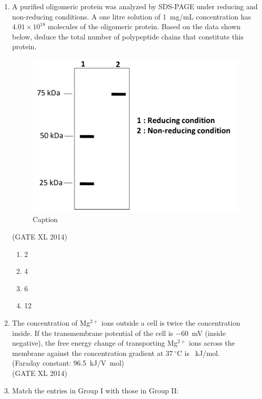 \documentclass[journal,12pt,onecolumn]{IEEEtran}
\theoremstyle{remark}
\begin{document}
\begin{enumerate}
\item A purified oligomeric protein was analyzed by SDS-PAGE under reducing and non-reducing conditions. A one litre solution of 1~mg/mL concentration has $4.01 \times 10^{18}$ molecules of the oligomeric protein. Based on the data shown below, deduce the total number of polypeptide chains that constitute this protein.
\begin{figure}[H]
    \centering
    \includegraphics[width=0.5\columnwidth]{fig25.png}
    \caption{Caption}
    \label{fig:placeholder}
\end{figure}
\hfill (GATE XL 2014)\\
\begin{multicols}{2}
\begin{enumerate}
\item 2
\item 4
\item 6
\item 12
\end{enumerate}
\end{multicols}

\item The concentration of Mg$^{2+}$ ions outside a cell is twice the concentration inside. If the transmembrane potential of the cell is $-60$~mV (inside negative), the free energy change of transporting Mg$^{2+}$ ions across the membrane against the concentration gradient at $37~^{\circ}$C is \underline{\hspace{2cm}}~kJ/mol. \\
{\footnotesize (Faraday constant: 96.5~kJ/V~mol)}\\
\hfill (GATE XL 2014)\\
\item Match the entries in Group I with those in Group II:


\end{enumerate}
\end{document}
